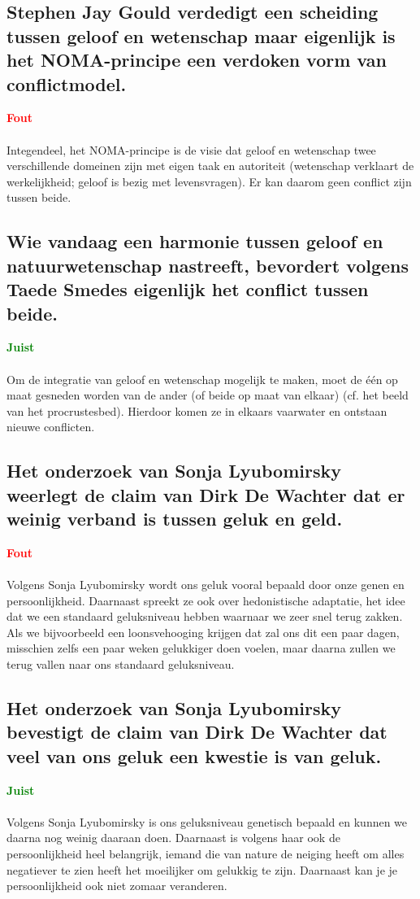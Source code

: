 \documentclass[11pt,a4paper,titlepage]{article}
\begin{document}
\subsection{Stephen Jay Gould verdedigt een scheiding tussen geloof en wetenschap maar eigenlijk is het NOMA-principe een verdoken vorm van conflictmodel.}
\textcolor{red}{\textbf{Fout}}\\\\
Integendeel, het NOMA-principe is de visie dat geloof en wetenschap twee verschillende domeinen zijn met eigen taak en autoriteit (wetenschap verklaart de werkelijkheid; geloof is bezig met levensvragen). Er kan daarom geen conflict zijn tussen beide.

\subsection{Wie vandaag een harmonie tussen geloof en natuurwetenschap nastreeft, bevordert volgens
Taede Smedes eigenlijk het conflict tussen beide.}
\textcolor{green}{\textbf{Juist}}\\\\
Om de integratie van geloof en wetenschap mogelijk te maken, moet de één op maat gesneden worden van de ander (of beide op maat van elkaar) (cf. het beeld van het procrustesbed). Hierdoor komen ze in elkaars vaarwater en ontstaan nieuwe conflicten.

\subsection{Het onderzoek van Sonja Lyubomirsky weerlegt de claim van Dirk De Wachter dat er weinig verband is tussen geluk en geld.}
\textcolor{red}{\textbf{Fout}}\\\\
Volgens Sonja Lyubomirsky wordt ons geluk vooral bepaald door onze genen en persoonlijkheid. Daarnaast spreekt ze ook over hedonistische adaptatie, het idee dat we een standaard geluksniveau hebben waarnaar we zeer snel terug zakken. Als we bijvoorbeeld een loonsvehooging krijgen dat zal ons dit een paar dagen, misschien zelfs een paar weken gelukkiger doen voelen, maar daarna zullen we terug vallen naar ons standaard geluksniveau.

\subsection{Het onderzoek van Sonja Lyubomirsky bevestigt de claim van Dirk De Wachter dat veel van ons geluk een kwestie is van geluk.}
\textcolor{green}{\textbf{Juist}}\\\\
Volgens Sonja Lyubomirsky is ons geluksniveau genetisch bepaald en kunnen we daarna nog weinig daaraan doen. Daarnaast is volgens haar ook de persoonlijkheid heel belangrijk, iemand die van nature de neiging heeft om alles negatiever te zien heeft het moeilijker om gelukkig te zijn. Daarnaast kan je je persoonlijkheid ook niet zomaar veranderen.
\end{document}
